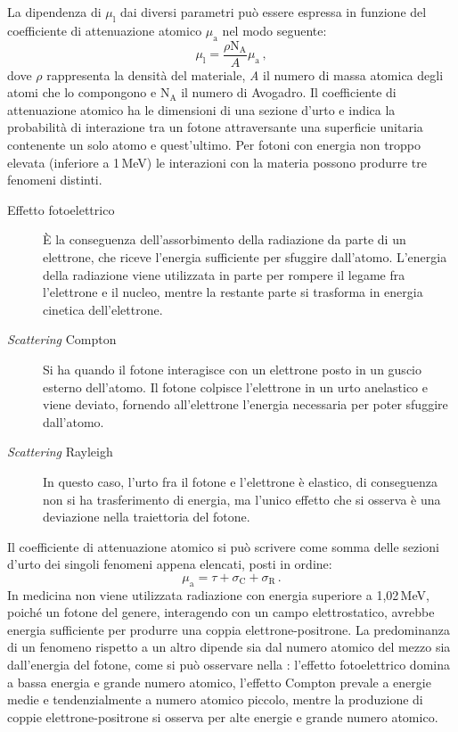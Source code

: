 La dipendenza di $\mu_\mathrm{l}$ dai diversi parametri può essere espressa in funzione del coefficiente di attenuazione atomico $\mu_\mathrm{a}$ nel modo seguente:
\begin{equation}
    \mu_\mathrm{l} = \frac{\rho \mathrm{N_A}}{A} \mu_\mathrm{a}\,,
\end{equation}
dove $\rho$ rappresenta la densità del materiale, \textit{A} il numero di massa atomica degli atomi che lo compongono e $\mathrm{N_A}$ il numero di Avogadro.
Il coefficiente di attenuazione atomico ha le dimensioni di una sezione d'urto e indica la probabilità di interazione tra un fotone attraversante una superficie unitaria contenente un solo atomo e quest'ultimo. Per fotoni con energia non troppo elevata (inferiore a 1\,MeV) le interazioni con la materia possono produrre tre fenomeni distinti.
\begin{description}
    \item[Effetto fotoelettrico] È la conseguenza dell'assorbimento della radiazione da parte di un elettrone, che riceve l'energia sufficiente per sfuggire dall'atomo. L'energia della radiazione viene utilizzata in parte per rompere il legame fra l'elettrone e il nucleo, mentre la restante parte si trasforma in energia cinetica dell'elettrone.
    \item[\textit{Scattering} Compton] Si ha quando il fotone interagisce con un elettrone posto in un guscio esterno dell'atomo. Il fotone colpisce l'elettrone in un urto anelastico e viene deviato, fornendo all'elettrone l'energia necessaria per poter sfuggire dall'atomo.
    \item[\textit{Scattering} Rayleigh] In questo caso, l'urto fra il fotone e l'elettrone è elastico, di conseguenza non si ha trasferimento di energia, ma l'unico effetto che si osserva è una deviazione nella traiettoria del fotone.
\end{description}
Il coefficiente di attenuazione atomico si può scrivere come somma delle sezioni d'urto dei singoli fenomeni appena elencati, posti in ordine:
\begin{equation}
    \mu_\mathrm{a} = \tau + \sigma_\mathrm{C} + \sigma_\mathrm{R}\,.
\end{equation}
In medicina non viene utilizzata radiazione con energia superiore a 1,02\,MeV, poiché un fotone del genere, interagendo con un campo elettrostatico, avrebbe energia sufficiente per produrre una coppia elettrone-positrone. La predominanza di un fenomeno rispetto a un altro dipende sia dal numero atomico del mezzo sia dall'energia del fotone, come si può osservare nella : l'effetto fotoelettrico domina a bassa energia e grande numero atomico, l'effetto Compton prevale a energie medie e tendenzialmente a numero atomico piccolo, mentre la produzione di coppie elettrone-positrone si osserva per alte energie e grande numero atomico.

